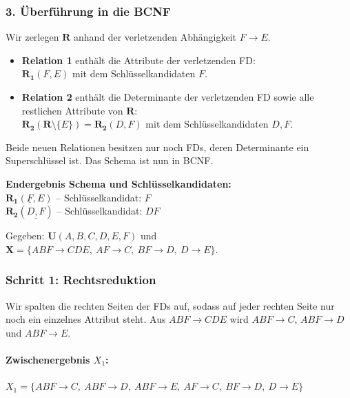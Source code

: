 \documentclass[12pt]{scrartcl}
\begin{document}
\subsubsection*{3. Überführung in die BCNF}
Wir zerlegen $\mathbf{R}$ anhand der verletzenden Abhängigkeit $F \rightarrow E$.
\begin{itemize}
    \item \textbf{Relation 1} enthält die Attribute der verletzenden FD: \\
    $\mathbf{R_1}(F, E)$ mit dem Schlüsselkandidaten \underline{$F$}.
    \item \textbf{Relation 2} enthält die Determinante der verletzenden FD sowie alle restlichen Attribute von $\mathbf{R}$: \\
    $\mathbf{R_2}(\mathbf{R} \setminus \{E\}) = \mathbf{R_2}(D, F)$ mit dem Schlüsselkandidaten \underline{$D, F$}.
\end{itemize}
Beide neuen Relationen besitzen nur noch FDs, deren Determinante ein Superschlüssel ist. Das Schema ist nun in BCNF.

\textbf{Endergebnis Schema und Schlüsselkandidaten:}\\
$\mathbf{R_1}(\underline{F}, E)$ -- Schlüsselkandidat: $F$ \\
$\mathbf{R_2}(\underline{D, F})$ -- Schlüsselkandidat: $DF$

\vspace{1cm}


Gegeben: $\mathbf{U}(A, B, C, D, E, F)$ und $\mathbf{X} = \{ABF \rightarrow CDE,\ AF \rightarrow C,\ BF \rightarrow D,\ D \rightarrow E\}$.

\subsubsection*{Schritt 1: Rechtsreduktion}
Wir spalten die rechten Seiten der FDs auf, sodass auf jeder rechten Seite nur noch ein einzelnes Attribut steht. Aus $ABF \rightarrow CDE$ wird $ABF \rightarrow C$, $ABF \rightarrow D$ und $ABF \rightarrow E$.
\paragraph{Zwischenergebnis $X_1$:}
$X_1 = \{ABF \rightarrow C,\ ABF \rightarrow D,\ ABF \rightarrow E,\ AF \rightarrow C,\ BF \rightarrow D,\ D \rightarrow E\}$
\end{document}
